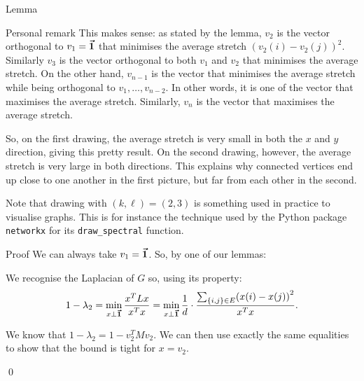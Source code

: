 \documentclass[a4paper]{article}
\begin{document}
\begin{parag}{Lemma}
\begin{subparag}{Personal remark}
        This makes sense: as stated by the lemma, $v_2$ is the vector orthogonal to $v_1 = \bm{\protect\vec{1}}$ that minimises the average stretch $\left(v_2\left(i\right) - v_2\left(j\right)\right)^2$. Similarly $v_3$ is the vector orthogonal to both $v_1$ and $v_2$ that minimises the average stretch. On the other hand, $v_{n-1}$ is the vector that minimises the average stretch while being orthogonal to $v_1, \ldots, v_{n-2}$. In other words, it is one of the vector that maximises the average stretch. Similarly, $v_n$ is the vector that maximises the average stretch.

        So, on the first drawing, the average stretch is very small in both the $x$ and $y$ direction, giving this pretty result. On the second drawing, however, the average stretch is very large in both directions. This explains why connected vertices end up close to one another in the first picture, but far from each other in the second.

        Note that drawing with $\left(k, \ell\right) = \left(2, 3\right)$ is something used in practice to visualise graphs. This is for instance the technique used by the Python package \texttt{networkx} for its \texttt{draw\_spectral} function.
    \end{subparag}
    
    \begin{subparag}{Proof}
        We can always take $v_1 = \bm{\protect\vec{1}}$. So, by one of our lemmas: 

        We recognise the Laplacian of $G$ so, using its property:
        \[1 - \lambda_2 = \min_{x \perp \bvec{1}} \frac{x^T L x}{x^T x} = \min_{x \perp \bvec{1}} \frac{1}{d}\cdot \frac{\sum_{\left\{i, j\right\} \in E} \left(x\left(i\right) - x\left(j\right)\right)^2}{x^T x}.\]

        We know that $1 - \lambda_2 = 1 - v_2^T M v_2$. We can then use exactly the same equalities to show that the bound is tight for $x = v_2$.

        \qed
    \end{subparag}
\end{parag}
 
\end{document}
